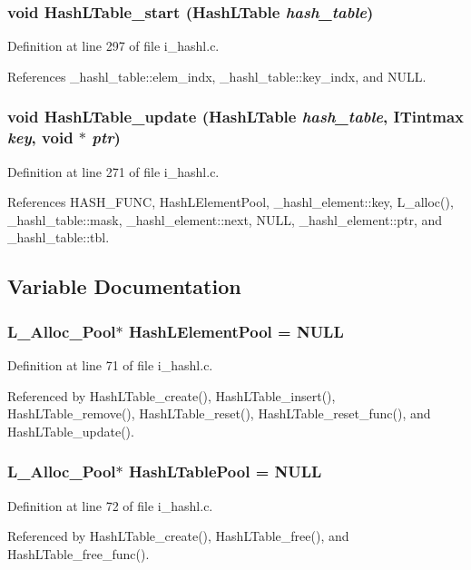 \subsubsection{\setlength{\rightskip}{0pt plus 5cm}void Hash\-LTable\_\-start (\bf{Hash\-LTable} {\em hash\_\-table})}\label{i__hashl_8c_5315f1b571d35c6c9a785026de68f323}




Definition at line 297 of file i\_\-hashl.c.

References \_\-hashl\_\-table::elem\_\-indx, \_\-hashl\_\-table::key\_\-indx, and NULL.
\subsubsection{\setlength{\rightskip}{0pt plus 5cm}void Hash\-LTable\_\-update (\bf{Hash\-LTable} {\em hash\_\-table}, \bf{ITintmax} {\em key}, void $\ast$ {\em ptr})}\label{i__hashl_8c_adb190156103a5ed13ca98235c657385}




Definition at line 271 of file i\_\-hashl.c.

References HASH\_\-FUNC, Hash\-LElement\-Pool, \_\-hashl\_\-element::key, L\_\-alloc(), \_\-hashl\_\-table::mask, \_\-hashl\_\-element::next, NULL, \_\-hashl\_\-element::ptr, and \_\-hashl\_\-table::tbl.

\subsection{Variable Documentation}
\subsubsection{\setlength{\rightskip}{0pt plus 5cm}\bf{L\_\-Alloc\_\-Pool}$\ast$ \bf{Hash\-LElement\-Pool} = NULL}\label{i__hashl_8c_eaabea78844a0658a3e78d29b54c1013}




Definition at line 71 of file i\_\-hashl.c.

Referenced by Hash\-LTable\_\-create(), Hash\-LTable\_\-insert(), Hash\-LTable\_\-remove(), Hash\-LTable\_\-reset(), Hash\-LTable\_\-reset\_\-func(), and Hash\-LTable\_\-update().
\subsubsection{\setlength{\rightskip}{0pt plus 5cm}\bf{L\_\-Alloc\_\-Pool}$\ast$ \bf{Hash\-LTable\-Pool} = NULL}\label{i__hashl_8c_0334d8420644c4cac1a1ad24023b3a44}




Definition at line 72 of file i\_\-hashl.c.

Referenced by Hash\-LTable\_\-create(), Hash\-LTable\_\-free(), and Hash\-LTable\_\-free\_\-func().
